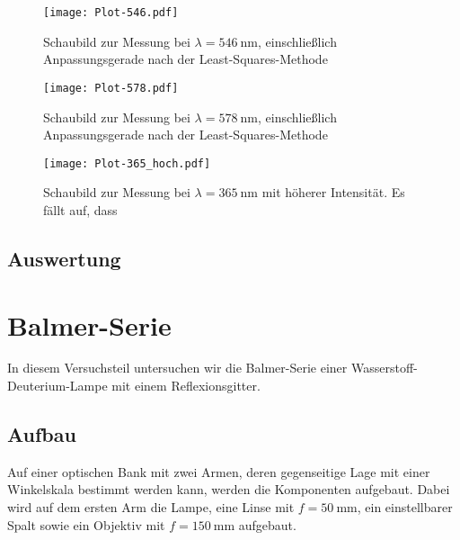 \begin{figure}
    \centering
    \texttt{[image: Plot-546.pdf]}
    \caption{%
        Schaubild zur Messung bei $\lambda = \SI{546}{\nano\meter}$,
        einschließlich Anpassungsgerade nach der Least-Squares-Methode
    }
    \label{fig:Plot_546}
\end{figure}

\begin{figure}
    \centering
    \texttt{[image: Plot-578.pdf]}
    \caption{%
        Schaubild zur Messung bei $\lambda = \SI{578}{\nano\meter}$,
        einschließlich Anpassungsgerade nach der Least-Squares-Methode
    }
    \label{fig:Plot_578}
\end{figure}

\begin{figure}
    \centering
    \texttt{[image: Plot-365\_hoch.pdf]}
    \caption{%
        Schaubild zur Messung bei $\lambda = \SI{365}{\nano\meter}$ mit höherer
        Intensität. Es fällt auf, dass
    }
    \label{fig:Plot_365_hoch}
\end{figure}

\FloatBarrier
\subsection{Auswertung}


\FloatBarrier
\section{Balmer-Serie}

In diesem Versuchsteil untersuchen wir die Balmer-Serie einer
Wasserstoff-Deuterium-Lampe mit einem Reflexionsgitter.

\FloatBarrier
\subsection{Aufbau}

Auf einer optischen Bank mit zwei Armen, deren gegenseitige Lage mit einer
Winkelskala bestimmt werden kann, werden die Komponenten aufgebaut. Dabei wird
auf dem ersten Arm die Lampe, eine Linse mit $f = \SI{50}{\milli\meter}$, ein
einstellbarer Spalt sowie ein Objektiv mit $f = \SI{150}{\milli\meter}$
aufgebaut.

